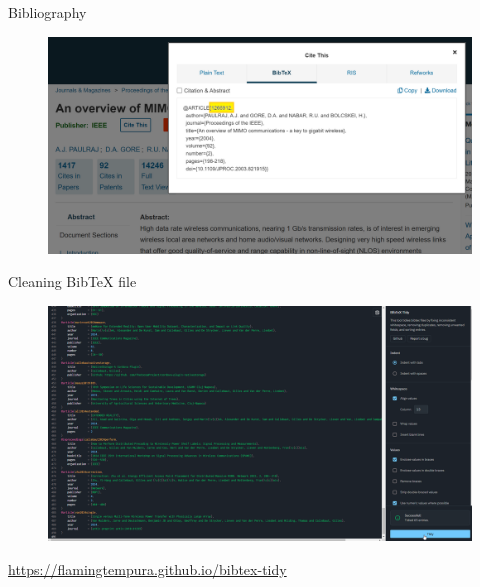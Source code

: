 \begin{frame}[fragile]{Bibliography}
\vspace{.5cm}
	\begin{figure}
		\includegraphics[width=.7\linewidth]{Figures/bib_2}
	\end{figure}
\end{frame}

\begin{frame}[fragile]{Cleaning BibTeX file}
\centering
	\begin{figure}
		\includegraphics[width=.7\linewidth]{Figures/bib3.png}
	\end{figure}
    \url{https://flamingtempura.github.io/bibtex-tidy}
\end{frame}



